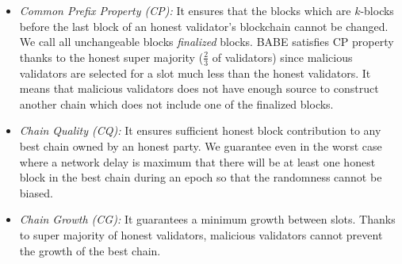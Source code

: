 \begin{itemize}
	\item \emph{Common Prefix Property (CP):} It ensures that the blocks which are $ k $-blocks before the last block of an honest validator's blockchain cannot be changed. We call  all unchangeable blocks  \emph{finalized} blocks. BABE satisfies CP property thanks to the honest super majority ($ \frac{2}{3}
	 $ of validators) since malicious validators are selected for a slot much less than the honest validators. It means that malicious validators does not have enough source to construct another chain which does not include one of the finalized blocks.
	\item \emph{Chain Quality (CQ):} It ensures sufficient honest block contribution to any best chain owned by an honest party.	We guarantee even in the worst case where a network delay is maximum that there will be at least one honest block in the best chain during an epoch so that the randomness cannot be biased.
	\item \emph{Chain Growth (CG):} It guarantees a minimum growth between slots. Thanks to super majority of honest validators, malicious validators cannot prevent the growth of the best chain.	
\end{itemize}
